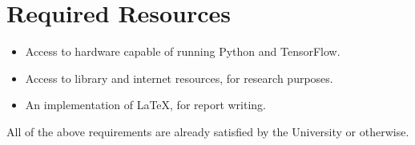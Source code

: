 \section*{Required Resources}
\begin{itemize}
    \item Access to hardware capable of running Python and TensorFlow.

    \item Access to library and internet resources, for research purposes.

    \item An implementation of \LaTeX, for report writing.
\end{itemize}
All of the above requirements are already satisfied by the University or
otherwise.
